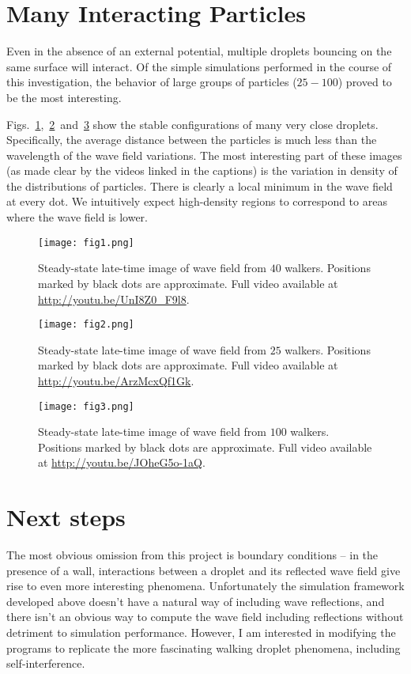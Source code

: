 \documentclass{article}
\begin{document}
\section{Many Interacting Particles}
\label{sec:xtalz}
Even in the absence of an external potential, multiple droplets bouncing on the same surface will interact. Of the simple simulations performed in the course of this investigation, the behavior of large groups of particles ($25-100$) proved to be the most interesting. 

Figs.~\ref{fig:f1},~\ref{fig:f2}~and~\ref{fig:f3} show the stable configurations of many very close droplets. Specifically, the average distance between the particles is much less than the wavelength of the wave field variations. The most interesting part of these images (as made clear by the videos linked in the captions) is the variation in density of the distributions of particles. There is clearly a local minimum in the wave field at every dot. We intuitively expect high-density regions to correspond to areas where the wave field is lower.


\begin{figure}[h!]
\label{fig:f1}
\texttt{[image: fig1.png]}
\caption{Steady-state late-time image of wave field from $40$ walkers. Positions marked by black dots are approximate. Full video available at \url{http://youtu.be/UnI8Z0_F9l8}.}
\end{figure}

\begin{figure}[h!]
\label{fig:f2}
\texttt{[image: fig2.png]}
\caption{Steady-state late-time image of wave field from $25$ walkers. Positions marked by black dots are approximate. Full video available at \url{http://youtu.be/ArzMcxQf1Gk}.}
\end{figure}

\begin{figure}[h!]
\label{fig:f3}
\texttt{[image: fig3.png]}
\caption{Steady-state late-time image of wave field from $100$ walkers. Positions marked by black dots are approximate. Full video available at \url{http://youtu.be/JOheG5o-1aQ}.}
\end{figure}

\section{Next steps}
The most obvious omission from this project is boundary conditions -- in the presence of a wall, interactions between a droplet and its reflected wave field give rise to even more interesting phenomena. Unfortunately the simulation framework developed above doesn't have a natural way of including wave reflections, and there isn't an obvious way to compute the wave field including reflections without detriment to simulation performance. However, I am interested in modifying the programs to replicate the more fascinating walking droplet phenomena, including self-interference.
\end{document}
